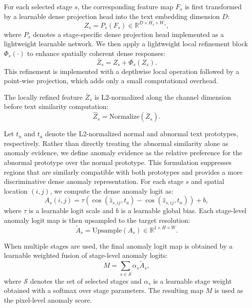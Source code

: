 \documentclass[10pt]{article}
\begin{document}
For each selected stage $s$, the corresponding feature map $F_s$ is first transformed by a learnable dense projection head into the text embedding dimension $D$:
\begin{equation}
Z_s = P_s(F_s) \in \mathbb{R}^{D \times H_s \times W_s},
\label{eq:projection}
\end{equation}
where $P_s$ denotes a stage-specific dense projection head implemented as a lightweight learnable network. We then apply a lightweight local refinement block $\Phi_s(\cdot)$ to enhance spatially coherent dense responses:
\begin{equation}
\bar{Z}_s = Z_s + \Phi_s(Z_s).
\label{eq:local_refinement}
\end{equation}
This refinement is implemented with a depthwise local operation followed by a point-wise projection, which adds only a small computational overhead.

The locally refined feature $\bar{Z}_s$ is L2-normalized along the channel dimension before text similarity computation:
\begin{equation}
\hat{Z}_s = \mathrm{Normalize}(\bar{Z}_s).
\label{eq:normalize}
\end{equation}

Let $t_n$ and $t_a$ denote the L2-normalized normal and abnormal text prototypes, respectively. Rather than directly treating the abnormal similarity alone as anomaly evidence, we define anomaly evidence as the relative preference for the abnormal prototype over the normal prototype. This formulation suppresses regions that are similarly compatible with both prototypes and provides a more discriminative dense anomaly representation. For each stage $s$ and spatial location $(i,j)$, we compute the dense anomaly logit as:
\begin{equation}
A_s(i,j) =
\tau \left(
\cos(\hat{z}_{s,ij}, t_a) -
\cos(\hat{z}_{s,ij}, t_n)
\right) + b,
\label{eq:stage_anom_logit}
\end{equation}
where $\tau$ is a learnable logit scale and $b$ is a learnable global bias. Each stage-level anomaly logit map is then upsampled to the target resolution:
\begin{equation}
\tilde{A}_s = \mathrm{Upsample}(A_s) \in \mathbb{R}^{1 \times H \times W}.
\label{eq:upsample}
\end{equation}

When multiple stages are used, the final anomaly logit map is obtained by a learnable weighted fusion of stage-level anomaly logits:
\begin{equation}
M = \sum_{s \in \mathcal{S}} \alpha_s \tilde{A}_s,
\label{eq:fusion}
\end{equation}
where $\mathcal{S}$ denotes the set of selected stages and $\alpha_s$ is a learnable stage weight obtained with a softmax over stage parameters. The resulting map $M$ is used as the pixel-level anomaly score.
\end{document}
